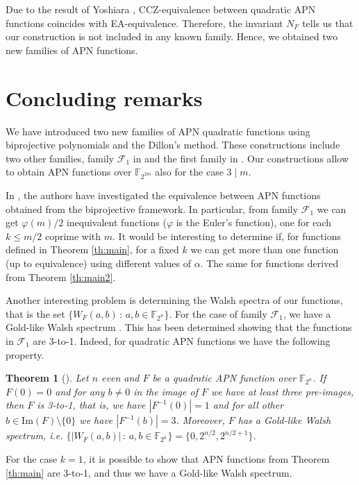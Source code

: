 \documentclass{article}
\newtheorem{theorem}{Theorem}
\newcommand{\cF}{\mathcal{F}}
\begin{document}
Due to the result of Yoshiara \cite{ccz-ea}, CCZ-equivalence between quadratic APN functions coincides with EA-equivalence. 
Therefore, the invariant $N_F$ tells us that our construction is not included in any known family. {Hence, we obtained two new families of APN functions.}

\section{Concluding remarks}
We have introduced two new families of APN quadratic functions using biprojective polynomials and the Dillon's method. These constructions include two other families, family $\mathcal{F}_1$ in \cite{GOLOGLU} and the first family in \cite{LZLQ}. Our constructions allow to obtain APN functions over $\mathbb{F}_{2^{2m}}$ also for the case $3\mid m$. 


In \cite{golkol}, the authors have investigated the equivalence between APN functions obtained from the biprojective framework. In particular, from  family $\cF_1$ we can get $\varphi(m)/2$ inequivalent functions ($\varphi$ is the Euler's function), one for each $k\le m/2$ coprime with $m$. It would be interesting to determine if, for functions defined in Theorem \ref{th:main}, for a fixed $k$ we can get more than one function (up to equivalence) using different values of $\alpha$.
The same for functions derived from Theorem \ref{th:main2}.

Another interesting problem is determining the Walsh spectra of our functions, that is the set $\{W_F(a,b)\,:\,a,b\in\mathbb{F}_{2^n}\}$. 
For the case of family $\cF_1$, we have a Gold-like Walsh spectrum \cite{KKK}. This has been determined showing that the functions in $\cF_1$ are 3-to-1.
Indeed, for quadratic APN functions we have the following property.
\begin{theorem}[\cite{KKK}]\label{th:3to1}
Let $n$ even and $F$ be a quadratic APN function over $\mathbb{F}_{2^n}$.
If $F(0)=0$ and for any $b\ne0$ in the image of $F$ we have at least three pre-images, then
$F$ is 3-to-1, that is, we have $|F^{-1}(0)|=1$ and for all other $b\in\mathrm{Im}(F)\setminus\{0\}$ we have $|F^{-1}(b)|=3$. Moreover, $F$ has a Gold-like Walsh spectrum, i.e. $\{|W_F(a,b)|\,:\,a,b \in \mathbb{F}_{2^n}\}=\{0,2^{n/2},2^{{n/2}+1}\}$.
\end{theorem}


For the case $k=1$, it is possible to show that APN functions from Theorem \ref{th:main} are 3-to-1, and thus we have a Gold-like Walsh spectrum.
\end{document}
